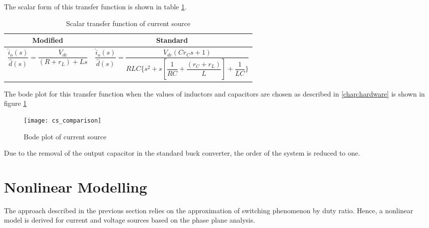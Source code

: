		The scalar form of this transfer function is shown in table \ref{tab:cstf}.
	\begin{table}[h]
	\centering
	\begin{tabular}{|p{4cm}|p{8cm}|} \hline
	\multicolumn{1}{|c|}{Modified} & \multicolumn{1}{c|}{Standard} \\ \hline
	\vspace{-2mm} \(\displaystyle \dfrac{\hat{i}_o(s)}{\hat{d}(s)} = \dfrac{V_{dc}}{(R+r_L)+Ls} \) & \vspace{-2mm} \(\displaystyle \dfrac{\hat{i}_o(s)}{\hat{d}(s)} = \dfrac{V_{dc}(Cr_Cs+1)}{RLC\{s^2+s\left[\dfrac{1}{RC} + \dfrac{(r_C + r_L)}{L} \right]+\dfrac{1}{LC}\}}\) \vspace{1mm} \\ \hline
	\end{tabular}
	\caption{Scalar transfer function of current source}
	\label{tab:cstf}
	\end{table}

	The bode plot for this transfer function when the values of inductors and capacitors are chosen as described in \ref{chap:hardware} is shown in figure \ref{fig:uncomp-cs}
	\begin{comment}
		\begin{figure}[H]
			\centering
			\texttt{[image: uncompensated-cs]}
			\caption{Bode plot of uncompensated current source transfer function; Gm = $\infty$,  Pm = 90.5$^\circ$ (at 6.05e+04 rad/s)}
			\label{fig:uncomp-cs}
		\end{figure}
	\end{comment}
	\begin{figure}[h]
		\centering
		\texttt{[image: cs\_comparison]}
		\caption{Bode plot of current source}
		\label{fig:uncomp-cs}
	\end{figure}
	Due to the removal of the output capacitor in the standard buck converter, the order of the system is reduced to one.
	
\section{Nonlinear Modelling}
	The approach described in the previous section relies on the approximation of switching phenomenon by duty ratio. Hence, a nonlinear model is derived for current and voltage sources based on the phase plane analysis.

